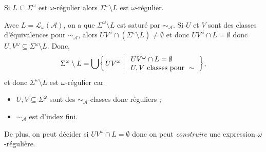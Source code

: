 \documentclass[./main]{subfiles}
\begin{document}
  \begingroup
  \def\thethm{\ref{thm:buchi-compl}}
  \begin{thm}[Büchi]
    Si $L \subseteq \Sigma^\omega$ est $\omega$-régulier alors $\Sigma^\omega \setminus L$ est $\omega$-régulier.
  \end{thm}
  \addtocounter{thm}{-1}
  \endgroup
  \begin{prv}
    Avec $L = \mathcal{L}_\omega(\mathcal{A})$, on a que $\Sigma^\omega \setminus L$ est saturé par $\sim_\mathcal{A}$. Si $U$ et $V$ sont des classes d'équivalences pour $\sim_\mathcal{A}$, alors
    $U V^\omega \cap (\Sigma^\omega \setminus L) \neq \emptyset$ et donc $U V^\omega \cap L = \emptyset$ donc $U, V^\omega \subseteq \Sigma^\omega \setminus L$.
    Donc, 
    \[
    \Sigma^\omega \setminus L = \bigcup \mleft\{\,U V^\omega \;\middle|\;
    \begin{array}{l}
      UV^\omega \cap L = \emptyset\\
      U, V \text{ classes pour } \sim
    \end{array}\,\mright\}  
    ,\]
    et donc $\Sigma^\omega \setminus L$ est $\omega$-régulier car
    \begin{itemize}
      \item $U, V \subseteq \Sigma^\omega$ sont des $\sim_\mathcal{A}$-classes donc réguliers ;
      \item $\sim_\mathcal{A}$ est d'index fini.
    \end{itemize}
    De plus, on peut décider si $U V^\omega \cap L = \emptyset$ donc on peut \textit{construire} une expression $\omega$-régulière.
  \end{prv}
\end{document}
